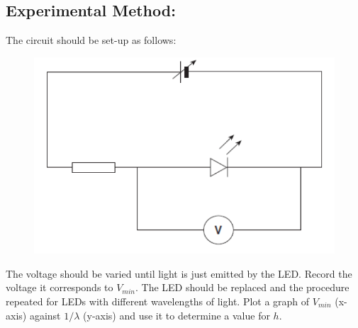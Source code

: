 \documentclass{tufte-handout}
\begin{document}
\subsection{Experimental Method:} The circuit should be set-up as follows: 
\begin{figure}
\includegraphics[width=\textwidth]{plank.PNG}
\end{figure}

The voltage should be varied until light is just emitted by the LED. Record the voltage it corresponds to $V_{min}$. The LED should be replaced and the procedure repeated for LEDs with different wavelengths of light.  Plot a graph of $V_{min}$ (x-axis) against $1/ \lambda$  (y-axis) and use it to determine a value for $h$. 
\end{document}
